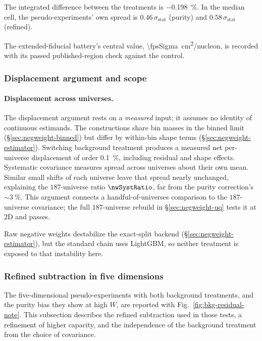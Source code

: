The integrated difference between the treatments is \SI{-0.198}{\percent}. In the median cell, the pseudo-experiments' own spread is $0.46\,\sigma_{\mathrm{stat}}$ (purity) and $0.58\,\sigma_{\mathrm{stat}}$ (refined).

The extended-fiducial battery's central value, \SI{\fpsSigma}{cm^2/nucleon}, is recorded with its passed published-region check against the control.

\subsubsection{Displacement argument and scope}

\paragraph{Displacement across universes.} The displacement argument rests on a \emph{measured} input; it assumes no identity of continuous estimands. The constructions share bin masses in the binned limit (\S\ref{sec:negweight-binned}) but differ by within-bin shape terms (\S\ref{sec:negweight-estimator}). Switching background treatment produces a measured net per-universe displacement of order \SI{0.1}{\percent}, including residual and shape effects. Systematic covariance measures spread across universes about their own mean. Similar small shifts of each universe leave that spread nearly unchanged, explaining the $187$-universe ratio $\nwSystRatio$, far from the purity correction's ${\sim}\SI{3}{\percent}$. This argument connects a handful-of-universes comparison to the $187$-universe covariance; the full $187$-universe rebuild in \S\ref{sec:negweight-uq} tests it at 2D and passes.

Raw negative weights destabilize the exact-split backend (\S\ref{sec:negweight-estimator}), but the standard chain uses LightGBM, so neither treatment is exposed to that instability here.

\subsubsection{Refined subtraction in five dimensions}

The five-dimensional pseudo-experiments with both background treatments, and the purity bias they show at high $W$, are reported with Fig.~\ref{fig:bkg-residual-note}. This subsection describes the refined subtraction used in those tests, a refinement of higher capacity, and the independence of the background treatment from the choice of covariance.
